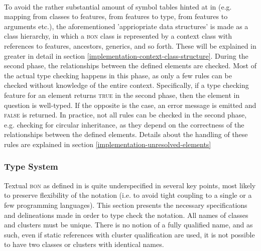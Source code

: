 \paragraph{} To avoid the rather substantial amount of symbol tables hinted at in \cite{appel2004} (e.g. mapping from classes to features, from features to type, from features to arguments etc.), the aforementioned 'appriopriate data structures' is made as a class hierarchy, in which a \textsc{bon} class is represented by a context class with references to features, ancestors, generics, and so forth. These will be explained in greater in detail in section \ref{implementation-context-class-structure}.
During the second phase, the relationships between the defined elements are checked. Most of the actual type checking happens in this phase, as only a few rules can be checked without knowledge of the entire context. Specifically, if a type checking feature for an element returns \textsc{true} in the second phase, then the element in question is well-typed. If the opposite is the case, an error message is emitted and \textsc{false} is returned. In practice, not all rules can be checked in the second phase, e.g. checking for circular inheritance, as they depend on the correctness of the relationships between the defined elements. Details about the handling of these rules are explained in section \ref{implementation-unresolved-elements}

\subsubsection {Type System}
\label{design-type-system}
Textual \textsc{bon} as defined in \cite{walden1995} is quite underspecified in several key points, most likely to preserve flexibility of the notation (i.e. to avoid tight coupling to a single or a few programming languages). This section presents the necessary specifications and delineations made in order to type check the notation.
\label{design-type-names}
All names of classes and clusters must be unique. There is no notion of a fully qualified name, and as such, even if static references with cluster qualification are used, it is not possible to have two classes or clusters with identical names.

